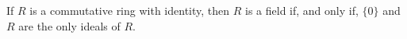 If $R$ is a commutative ring with identity, then $R$ is a field if, and only if, $\{0\}$ and $R$ are the only ideals of $R$.
